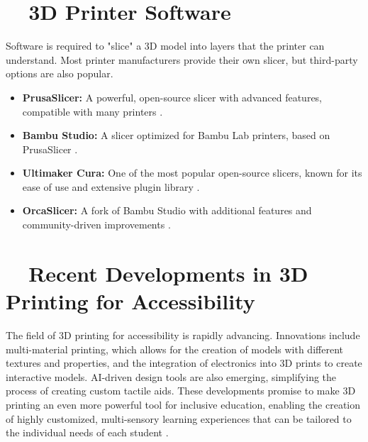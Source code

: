 \section{~~3D Printer Software}\label{ch5:sec:software}
Software is required to "slice" a 3D model into layers that the printer can understand. Most printer manufacturers provide their own slicer, but third-party options are also popular.
\begin{itemize}
	\item \textbf{PrusaSlicer:} A powerful, open-source slicer with advanced features, compatible with many printers \supercite{PrusaSlicer}.
	\item \textbf{Bambu Studio:} A slicer optimized for Bambu Lab printers, based on PrusaSlicer \supercite{BambuStudio}.
	\item \textbf{Ultimaker Cura:} One of the most popular open-source slicers, known for its ease of use and extensive plugin library \supercite{Cura}.
	\item \textbf{OrcaSlicer:} A fork of Bambu Studio with additional features and community-driven improvements \supercite{OrcaSlicer}.
\end{itemize}

\section{~~Recent Developments in 3D Printing for Accessibility}\label{ch5:sec:developments}
The field of 3D printing for accessibility is rapidly advancing. Innovations include multi-material printing, which allows for the creation of models with different textures and properties, and the integration of electronics into 3D prints to create interactive models. AI-driven design tools are also emerging, simplifying the process of creating custom tactile aids. These developments promise to make 3D printing an even more powerful tool for inclusive education, enabling the creation of highly customized, multi-sensory learning experiences that can be tailored to the individual needs of each student \supercite{Jo2016, LumaAI, Meshy}.

